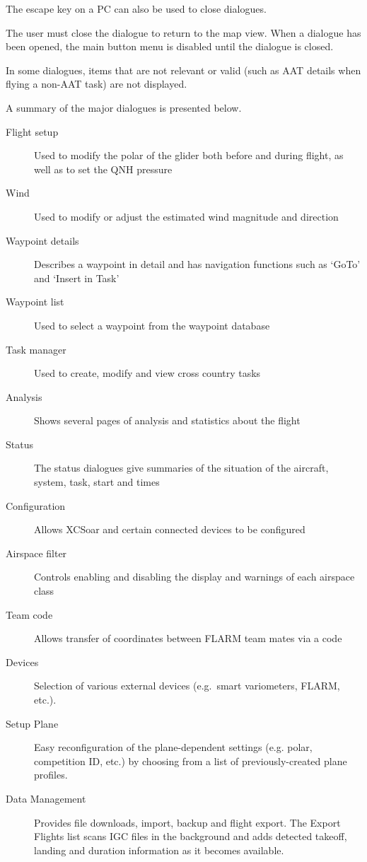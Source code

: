 The escape key on a PC can also be used to close dialogues.

The user must close the dialogue to return to the map view. When a dialogue
has been opened, the main button menu is disabled until the dialogue is closed.

In some dialogues, items that are not relevant or valid (such as AAT details when
flying a non-AAT task) are not displayed.

A summary of the major dialogues is presented below.
\begin{description}
\item[Flight setup] Used to modify the polar of the glider both before and
during flight, as well as to set the QNH pressure
\item[Wind] Used to modify or adjust the estimated wind magnitude and direction
\item[Waypoint details] Describes a waypoint in detail and has navigation
functions such as `GoTo' and `Insert in Task'
\item[Waypoint list] Used to select a waypoint from the waypoint database
\item[Task manager] Used to create, modify and view cross country tasks
\item[Analysis] Shows several pages of analysis and statistics about the flight
\item[Status] The status dialogues give summaries of the situation of the 
aircraft, system, task, start and times
\item[Configuration] Allows XCSoar and certain connected devices to be
configured
\item[Airspace filter] Controls enabling and disabling the display and warnings
of each airspace class
\item[Team code] Allows transfer of coordinates between FLARM team mates via a 
  code
\item[Devices]  Selection of various external devices (e.g.\ smart variometers,
  FLARM, etc.).
\item[Setup Plane]  Easy reconfiguration of the plane-dependent settings (e.g. 
  polar, competition ID, etc.) by choosing from a list of previously-created 
  plane profiles.
\item[Data Management] Provides file downloads, import, backup and flight
  export.  The Export Flights list scans IGC files in the background and adds
  detected takeoff, landing and duration information as it becomes available.
\end{description}

